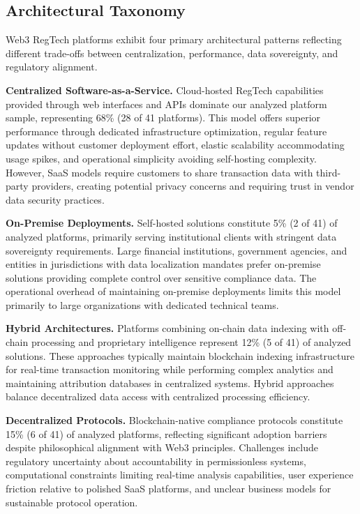 \documentclass[conference,compsoc]{IEEEtran}
\begin{document}
\subsection{Architectural Taxonomy}

Web3 RegTech platforms exhibit four primary architectural patterns reflecting different trade-offs between centralization, performance, data sovereignty, and regulatory alignment.

\noindent\textbf{Centralized Software-as-a-Service.}
Cloud-hosted RegTech capabilities provided through web interfaces and APIs dominate our analyzed platform sample, representing 68\% (28 of 41 platforms). This model offers superior performance through dedicated infrastructure optimization, regular feature updates without customer deployment effort, elastic scalability accommodating usage spikes, and operational simplicity avoiding self-hosting complexity. However, SaaS models require customers to share transaction data with third-party providers, creating potential privacy concerns and requiring trust in vendor data security practices.

\noindent\textbf{On-Premise Deployments.}
Self-hosted solutions constitute 5\% (2 of 41) of analyzed platforms, primarily serving institutional clients with stringent data sovereignty requirements. Large financial institutions, government agencies, and entities in jurisdictions with data localization mandates prefer on-premise solutions providing complete control over sensitive compliance data. The operational overhead of maintaining on-premise deployments limits this model primarily to large organizations with dedicated technical teams.

\noindent\textbf{Hybrid Architectures.}
Platforms combining on-chain data indexing with off-chain processing and proprietary intelligence represent 12\% (5 of 41) of analyzed solutions. These approaches typically maintain blockchain indexing infrastructure for real-time transaction monitoring while performing complex analytics and maintaining attribution databases in centralized systems. Hybrid approaches balance decentralized data access with centralized processing efficiency.

\noindent\textbf{Decentralized Protocols.}
Blockchain-native compliance protocols constitute 15\% (6 of 41) of analyzed platforms, reflecting significant adoption barriers despite philosophical alignment with Web3 principles. Challenges include regulatory uncertainty about accountability in permissionless systems, computational constraints limiting real-time analysis capabilities, user experience friction relative to polished SaaS platforms, and unclear business models for sustainable protocol operation.
\end{document}
